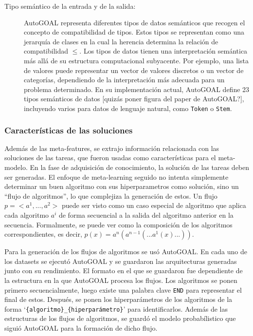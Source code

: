 \begin{itemize}
\begin{description}
		\item[Tipo semántico de la entrada y de la salida:] AutoGOAL representa diferentes tipos de datos semánticos que recogen el concepto de compatibilidad de tipos. Estos tipos se representan como una jerarquía de
		clases en la cual la herencia determina la relación de compatibilidad $\leq$. Los
		tipos de datos tienen una interpretación semántica más allá de su estructura computacional subyacente. Por ejemplo, una lista de valores puede representar un vector de valores discretos o un vector de categorías, dependiendo de la interpretación más adecuada para un problema determinado. En su implementación actual, AutoGOAL define 23 tipos semánticos de datos [quizás poner figura del paper de AutoGOAL?], incluyendo varios para datos de lenguaje natural, como \texttt{Token} o \texttt{Stem}.
		
	\end{description}
\end{itemize}

\subsubsection{Características de las soluciones}

Además de las meta-features, se extrajo información relacionada con las soluciones de las tareas, que fueron usadas como características para el meta-modelo. En la fase de adquisición de conocimiento, la solución de las tareas deben ser generadas. El enfoque de meta-learning seguido no intenta simplemente determinar un buen algoritmo con sus hiperparametros como solución, sino un ``flujo de algoritmos'', lo que complejiza la generación de estos. Un flujo $p = <a^1, ..., a^2>$  puede ser visto como un caso especial de algoritmo que aplica cada algoritmo $a^i$ de forma secuencial a la salida del algoritmo anterior en la secuencia. Formalmente, se puede ver como la composición de los algoritmos correspondientes, es decir, $p(x) = a^n(a^{n-1}(...a^1(x)...))$.

Para la generación de los flujos de algoritmos se usó AutoGOAL. En cada uno de los datasets se ejecutó AutoGOAL y se guardaron las arquitecturas generadas junto con su rendimiento. El formato en el que se guardaron fue dependiente de la estructura en la que AutoGOAL procesa los flujos. Los algoritmos se ponen primero secuencialmente, luego existe una palabra clave \texttt{END} para representar el final de estos. Después, se ponen los hiperparámetros de los algoritmos de la forma  `\texttt{\{algoritmo\}\_\{hiperparámetro\}}' para identificarlos. Además de las estructuras de los flujos de algoritmos, se guardó el modelo probabílistico que siguió AutoGOAL para la formación de dicho flujo.

